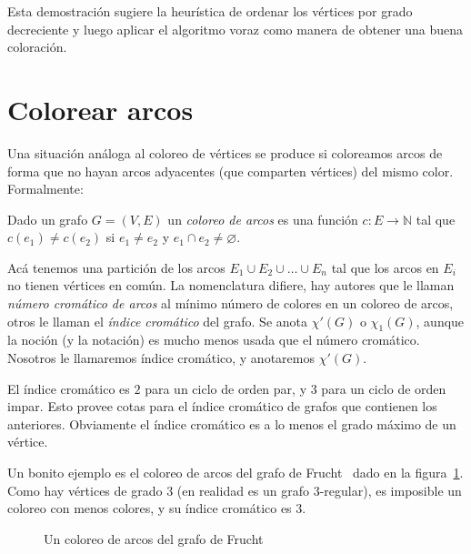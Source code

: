   Esta demostración sugiere la heurística
  de ordenar los vértices por grado decreciente
  y luego aplicar el algoritmo voraz
  como manera de obtener una buena coloración.


\section{Colorear arcos}
\label{sec:colorear-arcos}

  Una situación análoga al coloreo de vértices
  se produce si coloreamos arcos
  de forma que no hayan arcos adyacentes
  (que comparten vértices)
  del mismo color.
  Formalmente:
  \begin{definition}
    Dado un grafo \(G= (V, E)\) un \emph{coloreo de arcos}
    es una función \(c \colon E \rightarrow \mathbb{N}\)
    tal que \(c(e_1) \neq c(e_2)\)
    si \(e_1 \ne e_2\) y \(e_1 \cap e_2 \neq \varnothing\).
  \end{definition}

  Acá tenemos una partición de los arcos
  \(E_1 \cup E_2 \cup \dotso \cup E_n\)
  tal que los arcos en \(E_i\) no tienen vértices en común.
  La nomenclatura difiere,
  hay autores que le llaman \emph{número cromático de arcos}%
  al mínimo número de colores en un coloreo de arcos,
  otros le llaman el \emph{índice cromático} del grafo.%
  Se anota \(\chi'(G)\) o \(\chi_1(G)\),
  aunque la noción
  (y la notación)
  es mucho menos usada que el número cromático.
  Nosotros le llamaremos índice cromático,
  y anotaremos \(\chi'(G)\).

  El índice cromático es \(2\) para un ciclo de orden par,
  y \(3\) para un ciclo de orden impar.
  Esto provee cotas para el índice cromático
  de grafos que contienen los anteriores.
  Obviamente el índice cromático
  es a lo menos el grado máximo de un vértice.

  Un bonito ejemplo es el coloreo de arcos del grafo de Frucht~%
    \cite{frucht39:_herst_graph_gruppe}%
  dado en la figura~\ref{fig:Frucht}.
  Como hay vértices de grado \(3\)
  (en realidad es un grafo \(3\)\nobreakdash-regular),
  es imposible un coloreo con menos colores,
  y su índice cromático es \(3\).
  \begin{figure}[htbp]
    \centering
    \caption{Un coloreo de arcos del grafo de Frucht}
    \label{fig:Frucht}
  \end{figure}

